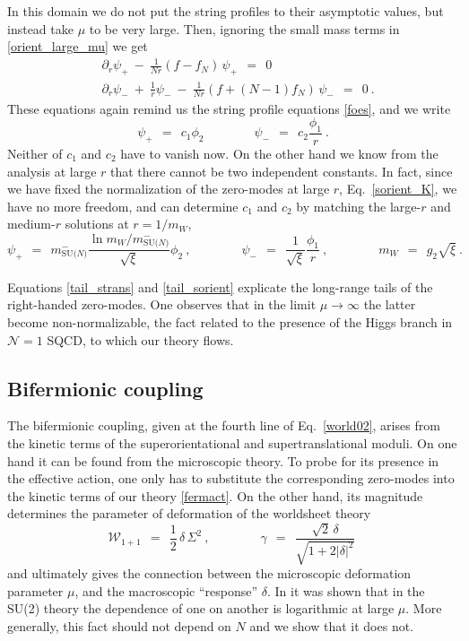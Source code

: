\documentclass[12pt]{article}
\newcommand{\none}{${\mathcal N}=1$ }
\newcommand{\p}{\partial}
\newcommand{\mNm}{m_\text{SU($N$)}^{-}}
\begin{document}
	In this domain we do not put the string profiles to their asymptotic values, but instead
	take $ \mu $ to be very large.
	Then, ignoring the small mass terms in \eqref{orient_large_mu} we get
\begin{align*}
%
	& \p_r \psi_+ ~-~ \frac{1}{Nr}(f - f_N)\, \psi_+ ~~=~~ 0 \\
%
	& \p_r \psi_- ~+~ \frac{1}{r}\psi_- ~-~ \frac{1}{Nr}(f + (N-1)f_N)\, \psi_- ~~=~~0~.
\end{align*}
	These equations again remind us the string profile equations \eqref{foes}, and we write
\[
	\psi_+ ~~=~~ c_1 \phi_2 \qquad\qquad	\psi_- ~~=~~ c_2 \frac{\phi_1}{r}~.
\]
	Neither of $ c_1 $ and $ c_2 $ have to vanish now.
	On the other hand we know from the analysis at large $ r $ that there cannot be two independent
	constants.
	In fact, since we have fixed the normalization of the zero-modes at large $ r $, Eq.~\eqref{sorient_K}, 
	we have no more freedom, and can determine $ c_1 $ and $ c_2 $ by matching the large-$r$
	and medium-$r$ solutions at $ r = 1/m_W $,
\begin{equation}
\label{tail_sorient}
	\psi_+ ~~=~~ \mNm \frac{\ln m_W/\mNm}{\sqrt{\xi}} \phi_2~,
	\qquad\qquad
	\psi_- ~~=~~ \frac{1}{\sqrt{\xi}} \frac{\phi_1}{r}~,
	\qquad\qquad
	m_W ~~=~~ g_2\sqrt{\xi}~.
\end{equation}
	
	Equations \eqref{tail_strans} and \eqref{tail_sorient} explicate the long-range tails of the
	right-handed zero-modes.
	One observes that in the limit $ \mu \to \infty $ the latter become non-normalizable, the fact
	related to the presence of the Higgs branch in \none SQCD, to which our theory flows.
	

\subsection{Bifermionic coupling}
	The bifermionic coupling, given at the fourth line of Eq.~\eqref{world02}, arises from the 
	kinetic terms of the superorientational and supertranslational moduli.
	On one hand it can be found from the microscopic theory. 
	To probe for its presence in the effective action, one only has to substitute the corresponding zero-modes 
	into the kinetic terms of our theory \eqref{fermact}.
	On the other hand, its magnitude determines the parameter of deformation of the worldsheet theory 
\[
	\mathcal{W}_{1+1} ~~=~~ \frac{1}{2}\,\delta\,\Sigma^2~,
	\qquad\qquad
	\gamma ~~=~~ \frac { \sqrt{2}\,\delta } { \sqrt{ 1 +  2 |\delta|^2 } }~
\]
	and ultimately gives the connection between the microscopic deformation parameter $ \mu $, and 
	the macroscopic ``response'' $ \delta $.
	In \cite{SYhet} it was shown that in the SU(2) theory the dependence of one on another is logarithmic at large 
	$ \mu $.
	More generally, this fact should not depend on $ N $ and we show that it does not.
\end{document}
